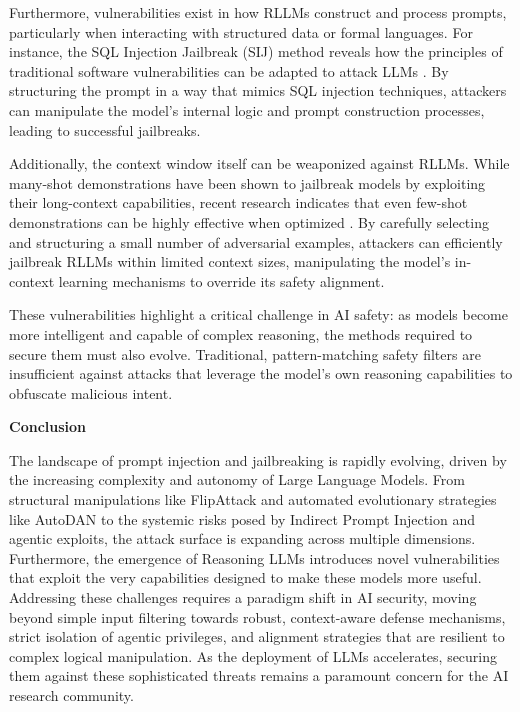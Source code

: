 \documentclass[11pt,a4paper]{article}
\begin{document}
Furthermore, vulnerabilities exist in how RLLMs construct and process prompts, particularly when interacting with structured data or formal languages. For instance, the SQL Injection Jailbreak (SIJ) method reveals how the principles of traditional software vulnerabilities can be adapted to attack LLMs \cite{Zhao_2024_SQL}. By structuring the prompt in a way that mimics SQL injection techniques, attackers can manipulate the model's internal logic and prompt construction processes, leading to successful jailbreaks.

Additionally, the context window itself can be weaponized against RLLMs. While many-shot demonstrations have been shown to jailbreak models by exploiting their long-context capabilities, recent research indicates that even few-shot demonstrations can be highly effective when optimized \cite{Zheng_2024_Improved}. By carefully selecting and structuring a small number of adversarial examples, attackers can efficiently jailbreak RLLMs within limited context sizes, manipulating the model's in-context learning mechanisms to override its safety alignment.

These vulnerabilities highlight a critical challenge in AI safety: as models become more intelligent and capable of complex reasoning, the methods required to secure them must also evolve. Traditional, pattern-matching safety filters are insufficient against attacks that leverage the model's own reasoning capabilities to obfuscate malicious intent.

\textbf{Conclusion}

The landscape of prompt injection and jailbreaking is rapidly evolving, driven by the increasing complexity and autonomy of Large Language Models. From structural manipulations like FlipAttack and automated evolutionary strategies like AutoDAN to the systemic risks posed by Indirect Prompt Injection and agentic exploits, the attack surface is expanding across multiple dimensions. Furthermore, the emergence of Reasoning LLMs introduces novel vulnerabilities that exploit the very capabilities designed to make these models more useful. Addressing these challenges requires a paradigm shift in AI security, moving beyond simple input filtering towards robust, context-aware defense mechanisms, strict isolation of agentic privileges, and alignment strategies that are resilient to complex logical manipulation. As the deployment of LLMs accelerates, securing them against these sophisticated threats remains a paramount concern for the AI research community.
\end{document}
